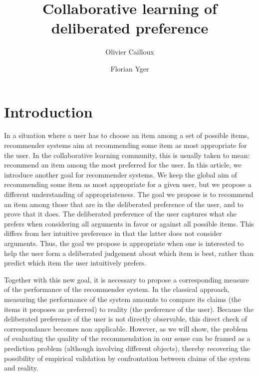 \documentclass[french, english]{da2pl2018}
\begin{document}
\title{%
	Collaborative learning of deliberated preference%
}
\author{Olivier Cailloux}
\author{Florian Yger}
\makeatletter
\makeatother
\maketitle

\section{Introduction}
In a situation where a user has to choose an item among a set of possible items, recommender systems aim at recommending some item as most appropriate for the user.
In the collaborative learning community, this is usually taken to mean: recommend an item among the most preferred for the user. In this article, we introduce another goal for recommender systems. We keep the global aim of recommending some item as most appropriate for a given user, but we propose a different understanding of appropriateness. The goal we propose is to recommend an item among those that are in the deliberated preference of the user, and to prove that it does. The deliberated preference of the user captures what she prefers when considering all arguments in favor or against all possible items. This differs from her intuitive preference in that the latter does not consider arguments. Thus, the goal we propose is appropriate when one is interested to help the user form a deliberated judgement about which item is best, rather than predict which item the user intuitively prefers.

Together with this new goal, it is necessary to propose a corresponding measure of the performance of the recommender system. In the classical approach, measuring the performance of the system amounts to compare its claims (the items it proposes as preferred) to reality (the preference of the user). Because the deliberated preference of the user is not directly observable, this direct check of correspondance becomes non applicable. However, as we will show, the problem of evaluating the quality of the recommendation in our sense can be framed as a prediction problem (although involving different objects), thereby recovering the possibility of empirical validation by confrontation between claims of the system and reality.
\end{document}
